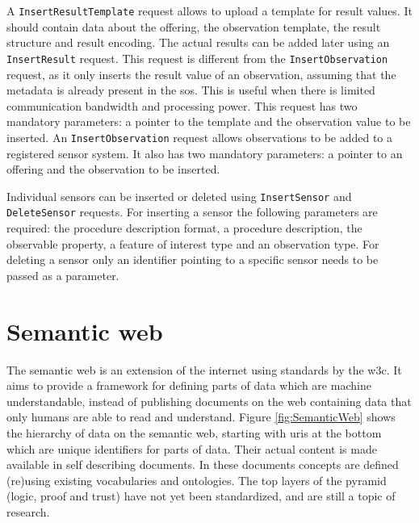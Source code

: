 A \texttt{InsertResultTemplate} request allows to upload a template for result values. It should contain data about the offering, the observation template, the result structure and result encoding. The actual results can be added later using an \texttt{InsertResult} request. This request is different from the \texttt{InsertObservation} request, as it only inserts the result value of an observation, assuming that the metadata is already present in the \ac{sos}. This is useful when there is limited communication bandwidth and processing power. This request has two mandatory parameters: a pointer to the template and the observation value to be inserted. An \texttt{InsertObservation} request allows observations to be added to a registered sensor system. It also has two mandatory parameters: a pointer to an offering and the observation to be inserted.

Individual sensors can be inserted or deleted using \texttt{InsertSensor} and \texttt{DeleteSensor} requests. For inserting a sensor the following parameters are required: the procedure description format, a procedure description, the observable property, a feature of interest type and an observation type. For deleting a sensor only an identifier pointing to a specific sensor needs to be passed as a parameter.


\section{Semantic web}
The semantic web is an extension of the internet using standards by the \ac{w3c}. It aims to provide a framework for defining parts of data which are machine understandable, instead of publishing documents on the web containing data that only humans are able to read and understand. Figure \ref{fig:SemanticWeb} shows the hierarchy of data on the semantic web, starting with \acp{uri} at the bottom which are unique identifiers for parts of data. Their actual content is made available in self describing documents. In these documents concepts are defined (re)using existing vocabularies and ontologies. The top layers of the pyramid (logic, proof and trust) have not yet been standardized, and are still a topic of research.  

